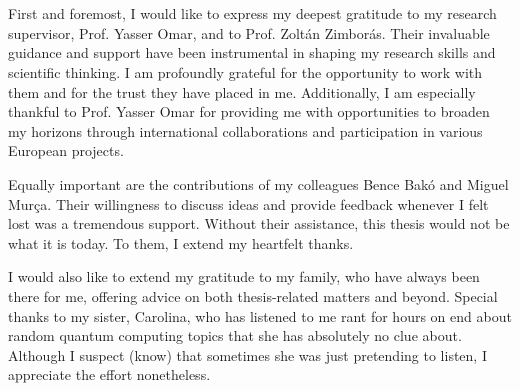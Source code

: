 
\section*{\acknowledgments}\label{sec:acknowledgments}



First and foremost, I would like to express my deepest gratitude to my research supervisor, Prof. Yasser Omar, and to Prof. Zoltán Zimborás. Their invaluable guidance and support have been instrumental in shaping my research skills and scientific thinking. I am profoundly grateful for the opportunity to work with them and for the trust they have placed in me. Additionally, I am especially thankful to Prof. Yasser Omar for providing me with opportunities to broaden my horizons through international collaborations and participation in various European projects.

Equally important are the contributions of my colleagues Bence Bakó and Miguel Murça. Their willingness to discuss ideas and provide feedback whenever I felt lost was a tremendous support. Without their assistance, this thesis would not be what it is today. To them, I extend my heartfelt thanks.

I would also like to extend my gratitude to my family, who have always been there for me, offering advice on both thesis-related matters and beyond.  Special thanks to my sister, Carolina, who has listened to me rant for hours on end about random quantum computing topics that she has absolutely no clue about. Although I suspect (know) that sometimes she was just pretending to listen, I appreciate the effort nonetheless.

